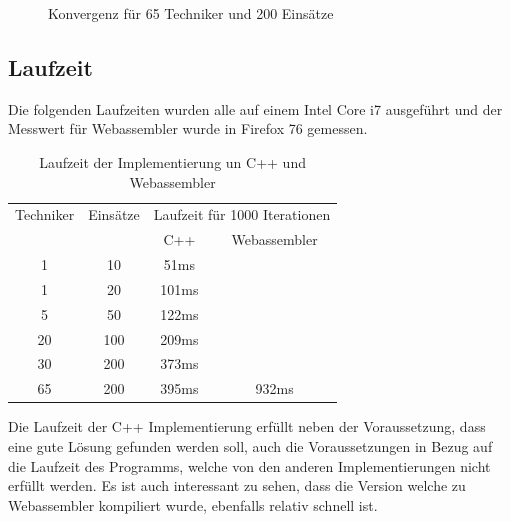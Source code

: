 \documentclass[a4paper,notitlepage,12pt]{report}
\begin{document}
\begin{figure}[H]
    \begin{center}
        \caption{Konvergenz für 65 Techniker und 200 Einsätze}
    \end{center}
\end{figure}

\subsection{Laufzeit}

Die folgenden Laufzeiten wurden alle auf einem Intel Core i7 ausgeführt und der Messwert
für Webassembler wurde in Firefox 76 gemessen.

\begin{table}[H]
    \begin{center}
        \begin{tabular}{c|c|c|c}
            Techniker & Einsätze & \multicolumn{2}{c}{Laufzeit für 1000 Iterationen} \\
            & & C++ & Webassembler \\
            \hline
            1 & 10 & 51ms & \\
            1 & 20 & 101ms & \\
            5 & 50 & 122ms & \\
            20 & 100 & 209ms & \\
            30 & 200 & 373ms & \\
            65 & 200 & 395ms & 932ms
        \end{tabular}
    \end{center}
    \caption{Laufzeit der Implementierung un C++ und Webassembler}
    \label{tab:time}
\end{table}

Die Laufzeit der C++ Implementierung erfüllt neben der Voraussetzung, dass eine
gute Lösung gefunden werden soll, auch die Voraussetzungen in Bezug auf die
Laufzeit des Programms, welche von den anderen Implementierungen nicht erfüllt
werden. Es ist auch interessant zu sehen, dass die Version welche zu Webassembler
kompiliert wurde, ebenfalls relativ schnell ist.
\end{document}
